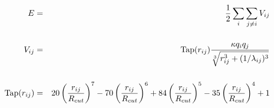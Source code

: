 \documentclass[aps,pr,onecolumn,superscriptaddress,noshowpacs,a4paper,15pt]{revtex4}
\begin{document}
\begingroup
\Large
\begin{eqnarray*}
  E & = & \frac{1}{2} \sum_i \sum_{j \neq i} V_{ij} \\[15pt]
  V_{ij} & = & {\rm Tap}(r_{ij})\frac{\kappa q_i q_j}{\sqrt[3]{r_{ij}^3+(1/\lambda_{ij})^3}}\\[15pt]
  {\rm Tap}(r_{ij}) & = & 20\left ( \frac{r_{ij}}{R_{cut}} \right )^7 -
                          70\left ( \frac{r_{ij}}{R_{cut}} \right )^6 +
                          84\left ( \frac{r_{ij}}{R_{cut}} \right )^5 -
                          35\left ( \frac{r_{ij}}{R_{cut}} \right )^4 + 1
\end{eqnarray*}
\endgroup
\end{document}
